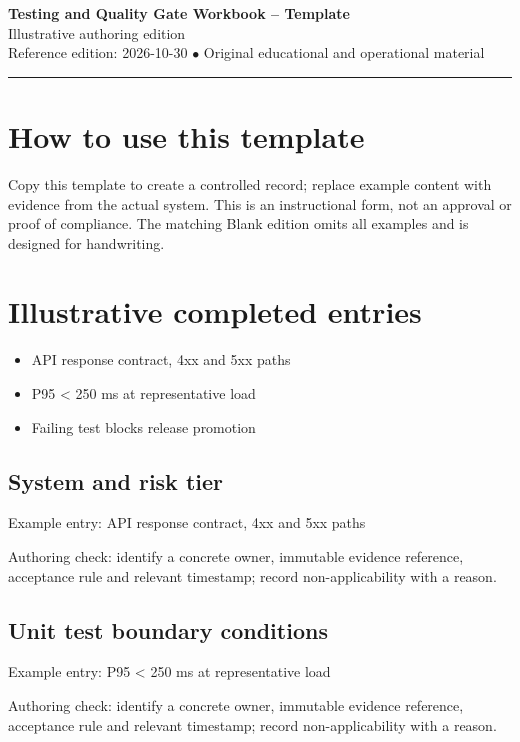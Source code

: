 \documentclass[10pt,letterpaper]{article}
\begin{document}
\begin{center}
{\LARGE\bfseries\color{cdblue}Testing and Quality Gate Workbook -- Template}\\[7pt]
{\large Illustrative authoring edition}\\[6pt]
{\small Reference edition: 2026-10-30 $\bullet$ Original educational and operational material}
\end{center}
\noindent\color{cdblue}\rule{\linewidth}{1.2pt}\color{black}
\vspace{0.4em}
\section{How to use this template}
Copy this template to create a controlled record; replace example content with evidence from the actual system. This is an instructional form, not an approval or proof of compliance. The matching Blank edition omits all examples and is designed for handwriting.


\section{Illustrative completed entries}
\begin{itemize}
\item API response contract, 4xx and 5xx paths
\item P95 < 250 ms at representative load
\item Failing test blocks release promotion
\end{itemize}

\subsection{System and risk tier}
Example entry: API response contract, 4xx and 5xx paths

Authoring check: identify a concrete owner, immutable evidence reference, acceptance rule and relevant timestamp; record non-applicability with a reason.


\subsection{Unit test boundary conditions}
Example entry: P95 < 250 ms at representative load

Authoring check: identify a concrete owner, immutable evidence reference, acceptance rule and relevant timestamp; record non-applicability with a reason.
\end{document}
